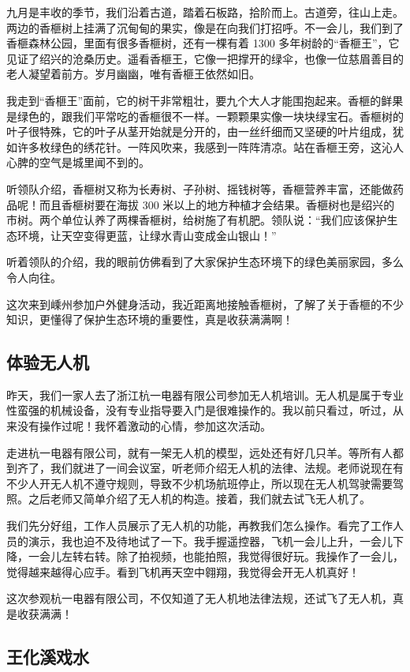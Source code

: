 \documentclass[UTF8,a4paper,titlepage,twoside,10.5pt]{article}
\begin{document}
九月是丰收的季节，我们沿着古道，踏着石板路，拾阶而上。古道旁，往山上走。两边的香榧树上挂满了沉甸甸的果实，像是在向我们打招呼。不一会儿，我们到了香榧森林公园，里面有很多香榧树，还有一棵有着 1300 多年树龄的“香榧王”，它见证了绍兴的沧桑历史。遥看香榧王，它像一把撑开的绿伞，也像一位慈眉善目的老人凝望着前方。岁月幽幽，唯有香榧王依然如旧。

我走到“香榧王”面前，它的树干非常粗壮，要九个大人才能围抱起来。香榧的鲜果是绿色的，跟我们平常吃的香榧很不一样。一颗颗果实像一块块绿宝石。香榧树的叶子很特殊，它的叶子从茎开始就是分开的，由一丝纤细而又坚硬的叶片组成，犹如许多枚绿色的绣花针。一阵风吹来，我感到一阵阵清凉。站在香榧王旁，这沁人心脾的空气是城里闻不到的。

听领队介绍，香榧树又称为长寿树、子孙树、摇钱树等，香榧营养丰富，还能做药品呢！而且香榧树要在海拔 300 米以上的地方种植才会结果。香榧树也是绍兴的市树。两个单位认养了两棵香榧树，给树施了有机肥。领队说：“我们应该保护生态环境，让天空变得更蓝，让绿水青山变成金山银山！”

听着领队的介绍，我的眼前仿佛看到了大家保护生态环境下的绿色美丽家园，多么令人向往。

这次来到嵊州参加户外健身活动，我近距离地接触香榧树，了解了关于香榧的不少知识，更懂得了保护生态环境的重要性，真是收获满满啊！

\subsection{体验无人机}
\label{sec:orge7ba064}

昨天，我们一家人去了浙江杭一电器有限公司参加无人机培训。无人机是属于专业性蛮强的机械设备，没有专业指导要入门是很难操作的。我以前只看过，听过，从来没有操作过呢！我怀着激动的心情，参加这次活动。

走进杭一电器有限公司，就有一架无人机的模型，远处还有好几只羊。等所有人都到齐了，我们就进了一间会议室，听老师介绍无人机的法律、法规。老师说现在有不少人开无人机不遵守规则，导致不少机场航班停止，所以现在无人机驾驶需要驾照。之后老师又简单介绍了无人机的构造。接着，我们就去试飞无人机了。

我们先分好组，工作人员展示了无人机的功能，再教我们怎么操作。看完了工作人员的演示，我也迫不及待地试了一下。我手握遥控器，飞机一会儿上升，一会儿下降，一会儿左转右转。除了拍视频，也能拍照，我觉得很好玩。我操作了一会儿，觉得越来越得心应手。看到飞机再天空中翱翔，我觉得会开无人机真好！

这次参观杭一电器有限公司，不仅知道了无人机地法律法规，还试飞了无人机，真是收获满满！

\subsection{王化溪戏水}
\label{sec:orgf98c14d}
\end{document}
